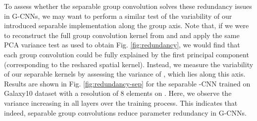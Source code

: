 \documentclass[nohyperref]{article}
\theoremstyle{plain}
\theoremstyle{definition}
\theoremstyle{remark}
\begin{document}
To assess whether the separable group convolution solves these redundancy issues in G-CNNs, we may want to perform a similar test of the variability of our introduced separable implementation along the group axis. Note that, if we were to reconstruct the full group convolution kernel  from  and  and apply the same PCA variance test as used to obtain Fig. \ref{fig:redundancy}, we would find that each group convolution could be fully explained by the first principal component (corresponding to the reshared spatial kernel). Instead, we measure the variability of our separable kernels by assessing the variance of , which lies along this axis. Results are shown in Fig. \ref{fig:redundancy-sep} for the separable -CNN trained on Galaxy10 dataset with a resolution of 8 elements on . Here, we observe the variance increasing in all layers over the training process. This indicates that indeed, separable group convolutions reduce parameter redundancy in G-CNNs.
\end{document}
